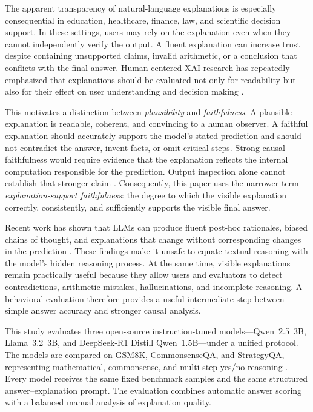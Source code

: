 \documentclass{article}
\begin{document}
The apparent transparency of natural-language explanations is especially consequential in education, healthcare, finance, law, and scientific decision support. In these settings, users may rely on the explanation even when they cannot independently verify the output. A fluent explanation can increase trust despite containing unsupported claims, invalid arithmetic, or a conclusion that conflicts with the final answer. Human-centered XAI research has repeatedly emphasized that explanations should be evaluated not only for readability but also for their effect on user understanding and decision making \cite{miller2019explanation,brahman2022human,doshivelez2017rigorous}.

This motivates a distinction between \emph{plausibility} and \emph{faithfulness}. A plausible explanation is readable, coherent, and convincing to a human observer. A faithful explanation should accurately support the model's stated prediction and should not contradict the answer, invent facts, or omit critical steps. Strong causal faithfulness would require evidence that the explanation reflects the internal computation responsible for the prediction. Output inspection alone cannot establish that stronger claim \cite{turpin2023language,lanham2023measuring,parcalabescu2024measuring}. Consequently, this paper uses the narrower term \emph{explanation-support faithfulness}: the degree to which the visible explanation correctly, consistently, and sufficiently supports the visible final answer.

Recent work has shown that LLMs can produce fluent post-hoc rationales, biased chains of thought, and explanations that change without corresponding changes in the prediction \cite{madsen2024selfexplanations,paul2024making,matton2025walk,zaman2025causal}. These findings make it unsafe to equate textual reasoning with the model's hidden reasoning process. At the same time, visible explanations remain practically useful because they allow users and evaluators to detect contradictions, arithmetic mistakes, hallucinations, and incomplete reasoning. A behavioral evaluation therefore provides a useful intermediate step between simple answer accuracy and stronger causal analysis.

This study evaluates three open-source instruction-tuned models---Qwen~2.5~3B, Llama~3.2~3B, and DeepSeek-R1 Distill Qwen~1.5B---under a unified protocol. The models are compared on GSM8K, CommonsenseQA, and StrategyQA, representing mathematical, commonsense, and multi-step yes/no reasoning \cite{cobbe2021gsm8k,talmor2019commonsenseqa,geva2021strategyqa}. Every model receives the same fixed benchmark samples and the same structured answer--explanation prompt. The evaluation combines automatic answer scoring with a balanced manual analysis of explanation quality.
\end{document}
